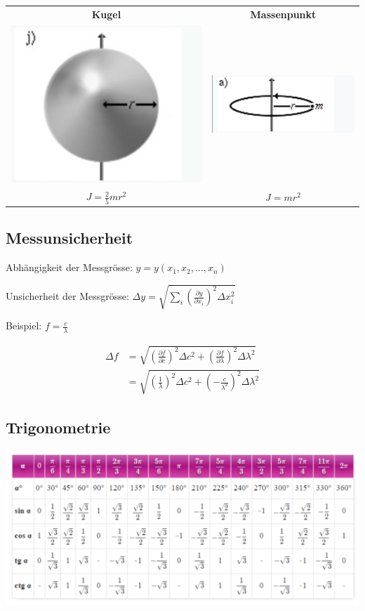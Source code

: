 \begin{center}
\begin{tabular}{| c | c |}
\hline
\textbf{Kugel} & \textbf{Massenpunkt} \\
\includegraphics[width=0.35\linewidth]{Bilder/Wellen-Optik/J_kugel} & \includegraphics[width=0.35\linewidth]{Bilder/Wellen-Optik/J_massepunkt} \\
$J = \frac{2}{5} m r^2$ & $J = m r^2$ \\
\hline
\end{tabular}
\end{center}


\subsection{Messunsicherheit}

Abhängigkeit der Messgrösse: $ y = y(x_1,x_2,...,x_n) $

Unsicherheit der Messgrösse: \( \Delta y = \sqrt{\sum_{i} \left( \frac{\partial y}{\partial x_i}\right)^2 \Delta x_i^2} \)

Beispiel: $ f = \frac{c}{\lambda} $

\begin{align*}
	\Delta f &= \sqrt{\left( \frac{\partial f}{\partial c}\right)^2 \Delta c^2 + \left( \frac{\partial f}{\partial \lambda}\right)^2 \Delta \lambda^2} \\
	         &= \sqrt{\left( \frac{1}{\lambda}\right)^2 \Delta c^2 + \left( - \frac{c}{\lambda^2}\right)^2 \Delta \lambda^2} 
\end{align*}



\subsection{Trigonometrie}
		
		
		\includegraphics[width=\linewidth]{Bilder/Wellen-Optik/trigo} 
		
